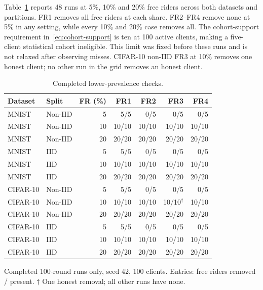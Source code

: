 \documentclass[journal]{IEEEtran}
\begin{document}
Table~\ref{tab:low-share} reports 48 runs at 5\%, 10\% and 20\% free
riders across both datasets and partitions. FR1 removes all free riders
at each share. FR2--FR4 remove none at 5\% in any setting, while every
10\% and 20\% case removes all. The cohort-support requirement
in~\eqref{eq:cohort-support} is ten at 100 active clients, making a
five-client statistical cohort ineligible. This limit was fixed before
these runs and is not relaxed after observing misses. CIFAR-10 non-IID
FR3 at 10\% removes one honest client; no other run in the grid removes
an honest client.

\begin{table}[t]\centering\footnotesize\setlength{\tabcolsep}{3pt}
\caption{Completed lower-prevalence checks.}\label{tab:low-share}
\begin{tabular}{llrrrrr}\toprule
Dataset & Split & FR (\%) & FR1 & FR2 & FR3 & FR4 \\ \midrule
MNIST & Non-IID & 5 & 5/5 & 0/5 & 0/5 & 0/5 \\
MNIST & Non-IID & 10 & 10/10 & 10/10 & 10/10 & 10/10 \\
MNIST & Non-IID & 20 & 20/20 & 20/20 & 20/20 & 20/20 \\
\midrule
MNIST & IID & 5 & 5/5 & 0/5 & 0/5 & 0/5 \\
MNIST & IID & 10 & 10/10 & 10/10 & 10/10 & 10/10 \\
MNIST & IID & 20 & 20/20 & 20/20 & 20/20 & 20/20 \\
\midrule
CIFAR-10 & Non-IID & 5 & 5/5 & 0/5 & 0/5 & 0/5 \\
CIFAR-10 & Non-IID & 10 & 10/10 & 10/10 & 10/10$^{\dagger}$ & 10/10 \\
CIFAR-10 & Non-IID & 20 & 20/20 & 20/20 & 20/20 & 20/20 \\
\midrule
CIFAR-10 & IID & 5 & 5/5 & 0/5 & 0/5 & 0/5 \\
CIFAR-10 & IID & 10 & 10/10 & 10/10 & 10/10 & 10/10 \\
CIFAR-10 & IID & 20 & 20/20 & 20/20 & 20/20 & 20/20 \\
\bottomrule
\end{tabular}
\par\smallskip\parbox{\columnwidth}{\scriptsize Completed 100-round runs only, seed 42, 100 clients. Entries: free riders removed / present. $\dagger$ One honest removal; all other runs have none.}
\end{table}

\end{document}
